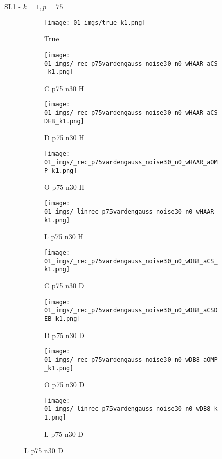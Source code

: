 \begin{frame}{SL1 - $k=1,p=75$}{}
\begin{figure}
\begin{subfigure}{0.1\textwidth}
\texttt{[image: 01\_imgs/true\_k1.png]}
\caption*{\Tiny True}
\end{subfigure}
\begin{subfigure}{0.1\textwidth}
\texttt{[image: 01\_imgs/\_rec\_p75vardengauss\_noise30\_n0\_wHAAR\_aCS\_k1.png]}
\caption*{\Tiny C p75 n30 H}
\end{subfigure}
\begin{subfigure}{0.1\textwidth}
\texttt{[image: 01\_imgs/\_rec\_p75vardengauss\_noise30\_n0\_wHAAR\_aCSDEB\_k1.png]}
\caption*{\Tiny D p75 n30 H}
\end{subfigure}
\begin{subfigure}{0.1\textwidth}
\texttt{[image: 01\_imgs/\_rec\_p75vardengauss\_noise30\_n0\_wHAAR\_aOMP\_k1.png]}
\caption*{\Tiny O p75 n30 H}
\end{subfigure}
\begin{subfigure}{0.1\textwidth}
\texttt{[image: 01\_imgs/\_linrec\_p75vardengauss\_noise30\_n0\_wHAAR\_k1.png]}
\caption*{\Tiny L p75 n30 H}
\end{subfigure}
\begin{subfigure}{0.1\textwidth}
\texttt{[image: 01\_imgs/\_rec\_p75vardengauss\_noise30\_n0\_wDB8\_aCS\_k1.png]}
\caption*{\Tiny C p75 n30 D}
\end{subfigure}
\begin{subfigure}{0.1\textwidth}
\texttt{[image: 01\_imgs/\_rec\_p75vardengauss\_noise30\_n0\_wDB8\_aCSDEB\_k1.png]}
\caption*{\Tiny D p75 n30 D}
\end{subfigure}
\begin{subfigure}{0.1\textwidth}
\texttt{[image: 01\_imgs/\_rec\_p75vardengauss\_noise30\_n0\_wDB8\_aOMP\_k1.png]}
\caption*{\Tiny O p75 n30 D}
\end{subfigure}
\begin{subfigure}{0.1\textwidth}
\texttt{[image: 01\_imgs/\_linrec\_p75vardengauss\_noise30\_n0\_wDB8\_k1.png]}
\caption*{\Tiny L p75 n30 D}
\end{subfigure}
\end{figure}
\end{frame}



